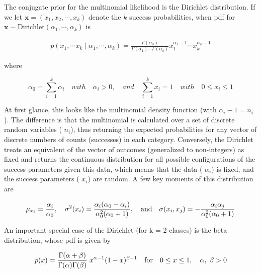 \documentclass{article}
\begin{document}
The conjugate prior for the multinomial likelihood is the Dirichlet distribution. If we let  $ \mathbf{x} = (x_1, x_2, \cdots, x_k) $ denote the  $ k $ success probabilities, when pdf for  $ \mathbf{x} \sim \text{Dirichlet}(\alpha_1, \cdots, \alpha_k) $ is

\begin{equation}
\begin{align*}p(x_1,\cdots x_k\mid\alpha_1,\cdots,\alpha_k)=\frac{\Gamma(\alpha_0)}{\Gamma(\alpha_1)\cdots\Gamma(\alpha_k)}x_1^{\alpha_1-1}\cdots x_k^{\alpha_k-1}\end{align*}
\end{equation}

where

\begin{equation}
\alpha_{0}=\sum_{i=1}^{k}\alpha_{i}\quad with\quad\alpha_{i}>0,\quad and\quad\sum_{i=1}^{k}x_{i}=1\quad with\quad0\leq x_{i}\leq1
\end{equation}

At first glance, this looks like the multinomial density function (with  $ \alpha_i - 1 = n_i $). The difference is that the multinomial is calculated over a set of discrete random variables ( $ n_i $), thus returning the expected probabilities for any vector of discrete numbers of counts (successes) in each category. Conversely, the Dirichlet treats an equivalent of the vector of outcomes (generalized to non-integers) as fixed and returns the continuous distribution for all possible configurations of the success parameters given this data, which means that the data ( $ \alpha_i $) is fixed, and the success parameters ( $ x_i $) are random. A few key moments of this distribution are

\begin{equation}
\begin{align*}\mu_{x_i}={\alpha_i\over\alpha_0},\quad\sigma^2(x_i)={\alpha_i(\alpha_0-\alpha_i)\over\alpha_0^2(\alpha_0+1)},\quad{\rm and}\quad\sigma(x_i,x_j)=-{\alpha_i\alpha_j\over\alpha_0^2(\alpha_0+1)}\end{align*}
\end{equation}

An important special case of the Dirichlet (for k = 2 classes) is the beta distribution, whose pdf is given by

\begin{equation}
\begin{align*}p(x)=\frac{\Gamma(\alpha+\beta)}{\Gamma(\alpha)\Gamma(\beta)}\;x^{\alpha-1}(1-x)^{\beta-1}\quad{\rm for}\quad0\le x\le1,\quad\alpha,\;\beta>0\end{align*}
\end{equation}
\end{document}
